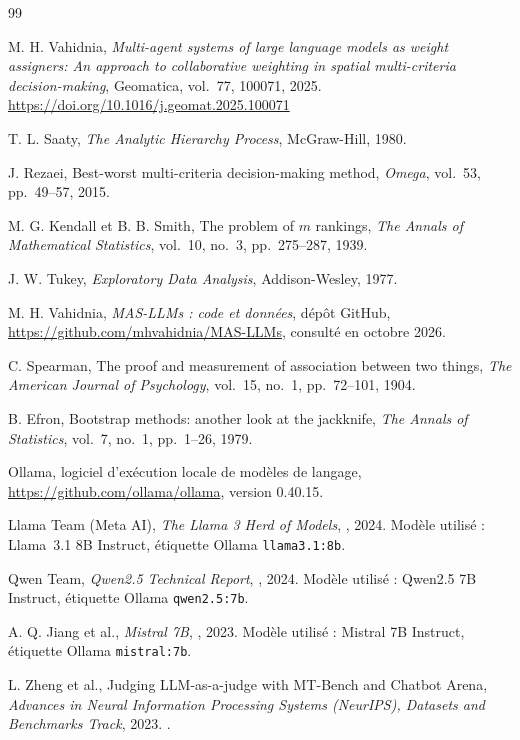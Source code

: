 \documentclass[11pt,a4paper]{article}
\newcommand{\code}[1]{\texttt{#1}}
\begin{document}
\begin{thebibliography}{99}
\setlength{\itemsep}{2pt}
\small

 M. H. Vahidnia, \emph{Multi-agent systems of large language models as weight assigners: An approach to collaborative weighting in spatial multi-criteria decision-making}, Geomatica, vol.~77, 100071, 2025. \url{https://doi.org/10.1016/j.geomat.2025.100071}

 T. L. Saaty, \emph{The Analytic Hierarchy Process}, McGraw-Hill, 1980.

 J. Rezaei, Best-worst multi-criteria decision-making method, \emph{Omega}, vol.~53, pp.~49--57, 2015.

 M. G. Kendall et B. B. Smith, The problem of $m$ rankings, \emph{The Annals of Mathematical Statistics}, vol.~10, no.~3, pp.~275--287, 1939.

 J. W. Tukey, \emph{Exploratory Data Analysis}, Addison-Wesley, 1977.

 M. H. Vahidnia, \emph{MAS-LLMs : code et données}, dépôt GitHub, \url{https://github.com/mhvahidnia/MAS-LLMs}, consulté en octobre 2026.

 C. Spearman, The proof and measurement of association between two things, \emph{The American Journal of Psychology}, vol.~15, no.~1, pp.~72--101, 1904.

 B. Efron, Bootstrap methods: another look at the jackknife, \emph{The Annals of Statistics}, vol.~7, no.~1, pp.~1--26, 1979.

 Ollama, logiciel d'exécution locale de modèles de langage, \url{https://github.com/ollama/ollama}, version 0.40.15.

 Llama Team (Meta AI), \emph{The Llama 3 Herd of Models}, , 2024. Modèle utilisé : Llama~3.1 8B Instruct, étiquette Ollama \code{llama3.1:8b}.

 Qwen Team, \emph{Qwen2.5 Technical Report}, , 2024. Modèle utilisé : Qwen2.5 7B Instruct, étiquette Ollama \code{qwen2.5:7b}.

 A. Q. Jiang et al., \emph{Mistral 7B}, , 2023. Modèle utilisé : Mistral 7B Instruct, étiquette Ollama \code{mistral:7b}.

 L. Zheng et al., Judging LLM-as-a-judge with MT-Bench and Chatbot Arena, \emph{Advances in Neural Information Processing Systems (NeurIPS), Datasets and Benchmarks Track}, 2023. .

\end{thebibliography}
\end{document}
